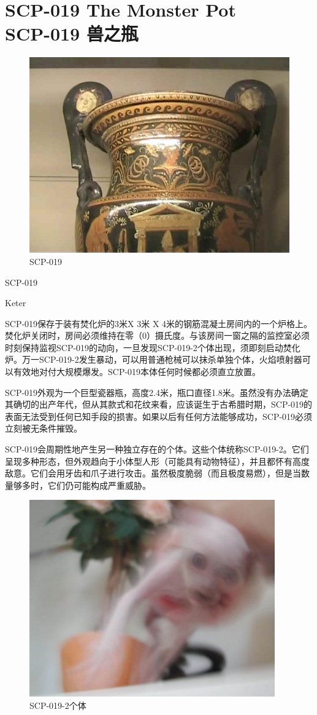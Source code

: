 \chapter[SCP-019 兽之瓶]{
    SCP-019 The Monster Pot\\
    SCP-019 兽之瓶
}

\label{chap:SCP-019}

\begin{figure}[H]
    \centering
    \includegraphics[width=0.5\linewidth]{images/SCP-019.jpg}
    \caption*{SCP-019}
\end{figure}

SCP-019

Keter

SCP-019保存于装有焚化炉的3米X 3米 X 4米的钢筋混凝土房间内的一个炉格上。焚化炉关闭时，房间必须维持在零（0）摄氏度。与该房间一窗之隔的监控室必须时刻保持监视SCP-019的动向，一旦发现SCP-019-2个体出现，须即刻启动焚化炉。万一SCP-019-2发生暴动，可以用普通枪械可以抹杀单独个体，火焰喷射器可以有效地对付大规模爆发。SCP-019本体任何时候都必须直立放置。

SCP-019外观为一个巨型瓷器瓶，高度2.4米，瓶口直径1.8米。虽然没有办法确定其确切的出产年代，但从其款式和花纹来看，应该诞生于古希腊时期，SCP-019的表面无法受到任何已知手段的损害。如果以后有任何方法能够成功，SCP-019必须立刻被无条件摧毁。

SCP-019会周期性地产生另一种独立存在的个体。这些个体统称SCP-019-2。它们呈现多种形态，但外观趋向于小体型人形（可能具有动物特征），并且都怀有高度敌意。它们会用牙齿和爪子进行攻击。虽然极度脆弱（而且极度易燃），但是当数量够多时，它们仍可能构成严重威胁。

\begin{figure}[H]
    \centering
    \includegraphics[width=0.5\linewidth]{images/SCP-019-2.jpg}
    \caption*{SCP-019-2个体}
\end{figure}

